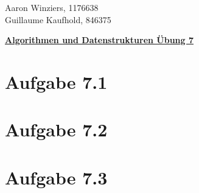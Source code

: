 \documentclass[10pt,a4paper]{article}
\begin{document}
	\begin{flushright}
		Aaron Winziers, 1176638	\\
		Guillaume Kaufhold, 846375
	\end{flushright}
	\begin{center}
		\underline{\textbf{Algorithmen und Datenstrukturen Übung 7}}
	\end{center}
	\section*{Aufgabe 7.1}		
	
	\section*{Aufgabe 7.2}
	
	\section*{Aufgabe 7.3}
\end{document}
